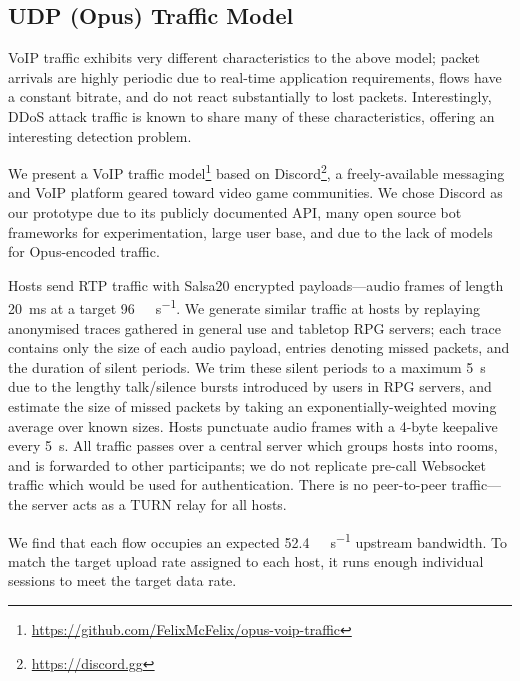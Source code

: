 \documentclass[10pt, times, comsoc]{IEEEtran}
\begin{document}
\subsection{UDP (Opus) Traffic Model}
VoIP traffic exhibits very different characteristics to the above model; packet arrivals are highly periodic due to real-time application requirements, flows have a constant bitrate, and do not react substantially to lost packets.
Interestingly, DDoS attack traffic is known to share many of these characteristics, offering an interesting detection problem.

We present a VoIP traffic model\footnote{\url{https://github.com/FelixMcFelix/opus-voip-traffic}} based on Discord\footnote{\url{https://discord.gg}}, a freely-available messaging and VoIP platform geared toward video game communities.
We chose Discord as our prototype due to its publicly documented API, many open source bot frameworks for experimentation, large user base, and due to the lack of models for Opus-encoded traffic.

Hosts send RTP traffic with Salsa20 encrypted payloads---audio frames of length \SI{20}{\milli\second} at a target \SI{96}{\kilo\bit\per\second}.
We generate similar traffic at hosts by replaying anonymised traces gathered in general use and tabletop RPG servers; each trace contains only the size of each audio payload, entries denoting missed packets, and the duration of silent periods.
We trim these silent periods to a maximum \SI{5}{\second} due to the lengthy talk/silence bursts introduced by users in RPG servers, and estimate the size of missed packets by taking an exponentially-weighted moving average over known sizes.
Hosts punctuate audio frames with a 4-byte keepalive every \SI{5}{\second}.
All traffic passes over a central server which groups hosts into rooms, and is forwarded to other participants; we do not replicate pre-call Websocket traffic which would be used for authentication.
There is no peer-to-peer traffic---the server acts as a TURN relay \cite{rfc5766} for all hosts.

We find that each flow occupies an expected \SI{52.4}{\kilo\bit\per\second} upstream bandwidth.
To match the target upload rate assigned to each host, it runs enough individual sessions to meet the target data rate.

\end{document}
